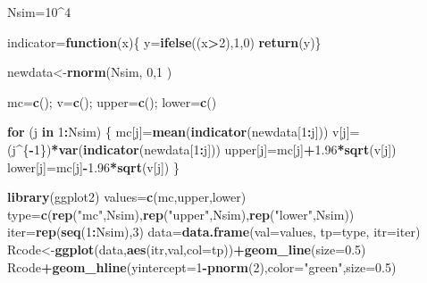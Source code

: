 \documentclass[]{book}
\newenvironment{Shaded}{\begin{snugshade}}{\end{snugshade}}
\newcommand{\ControlFlowTok}[1]{\textcolor[rgb]{0.13,0.29,0.53}{\textbf{#1}}}
\newcommand{\DataTypeTok}[1]{\textcolor[rgb]{0.13,0.29,0.53}{#1}}
\newcommand{\DecValTok}[1]{\textcolor[rgb]{0.00,0.00,0.81}{#1}}
\newcommand{\FloatTok}[1]{\textcolor[rgb]{0.00,0.00,0.81}{#1}}
\newcommand{\KeywordTok}[1]{\textcolor[rgb]{0.13,0.29,0.53}{\textbf{#1}}}
\newcommand{\NormalTok}[1]{#1}
\newcommand{\OperatorTok}[1]{\textcolor[rgb]{0.81,0.36,0.00}{\textbf{#1}}}
\newcommand{\StringTok}[1]{\textcolor[rgb]{0.31,0.60,0.02}{#1}}
\begin{document}
\begin{Shaded}
\begin{Highlighting}[]
\NormalTok{Nsim=}\DecValTok{10}\OperatorTok{^}\DecValTok{4}

\NormalTok{indicator=}\ControlFlowTok{function}\NormalTok{(x)\{}
\NormalTok{y=}\KeywordTok{ifelse}\NormalTok{((x}\OperatorTok{>}\DecValTok{2}\NormalTok{),}\DecValTok{1}\NormalTok{,}\DecValTok{0}\NormalTok{)}
\KeywordTok{return}\NormalTok{(y)\}}

\NormalTok{newdata<-}\KeywordTok{rnorm}\NormalTok{(Nsim, }\DecValTok{0}\NormalTok{,}\DecValTok{1}\NormalTok{ )}

\NormalTok{mc=}\KeywordTok{c}\NormalTok{(); v=}\KeywordTok{c}\NormalTok{(); upper=}\KeywordTok{c}\NormalTok{(); lower=}\KeywordTok{c}\NormalTok{()}

\ControlFlowTok{for}\NormalTok{ (j }\ControlFlowTok{in} \DecValTok{1}\OperatorTok{:}\NormalTok{Nsim)}
\NormalTok{\{}
\NormalTok{mc[j]=}\KeywordTok{mean}\NormalTok{(}\KeywordTok{indicator}\NormalTok{(newdata[}\DecValTok{1}\OperatorTok{:}\NormalTok{j]))}
\NormalTok{v[j]=(j}\OperatorTok{^}\NormalTok{\{}\OperatorTok{-}\DecValTok{1}\NormalTok{\})}\OperatorTok{*}\KeywordTok{var}\NormalTok{(}\KeywordTok{indicator}\NormalTok{(newdata[}\DecValTok{1}\OperatorTok{:}\NormalTok{j]))}
\NormalTok{upper[j]=mc[j]}\OperatorTok{+}\FloatTok{1.96}\OperatorTok{*}\KeywordTok{sqrt}\NormalTok{(v[j])}
\NormalTok{lower[j]=mc[j]}\OperatorTok{-}\FloatTok{1.96}\OperatorTok{*}\KeywordTok{sqrt}\NormalTok{(v[j])}
\NormalTok{\}}

\KeywordTok{library}\NormalTok{(ggplot2)}
\NormalTok{values=}\KeywordTok{c}\NormalTok{(mc,upper,lower)}
\NormalTok{type=}\KeywordTok{c}\NormalTok{(}\KeywordTok{rep}\NormalTok{(}\StringTok{"mc"}\NormalTok{,Nsim),}\KeywordTok{rep}\NormalTok{(}\StringTok{"upper"}\NormalTok{,Nsim),}\KeywordTok{rep}\NormalTok{(}\StringTok{"lower"}\NormalTok{,Nsim))}
\NormalTok{iter=}\KeywordTok{rep}\NormalTok{(}\KeywordTok{seq}\NormalTok{(}\DecValTok{1}\OperatorTok{:}\NormalTok{Nsim),}\DecValTok{3}\NormalTok{)}
\NormalTok{data=}\KeywordTok{data.frame}\NormalTok{(}\DataTypeTok{val=}\NormalTok{values, }\DataTypeTok{tp=}\NormalTok{type, }\DataTypeTok{itr=}\NormalTok{iter)}
\NormalTok{Rcode<-}\KeywordTok{ggplot}\NormalTok{(data,}\KeywordTok{aes}\NormalTok{(itr,val,}\DataTypeTok{col=}\NormalTok{tp))}\OperatorTok{+}\KeywordTok{geom_line}\NormalTok{(}\DataTypeTok{size=}\FloatTok{0.5}\NormalTok{)}
\NormalTok{Rcode}\OperatorTok{+}\KeywordTok{geom_hline}\NormalTok{(}\DataTypeTok{yintercept=}\DecValTok{1}\OperatorTok{-}\KeywordTok{pnorm}\NormalTok{(}\DecValTok{2}\NormalTok{),}\DataTypeTok{color=}\StringTok{"green"}\NormalTok{,}\DataTypeTok{size=}\FloatTok{0.5}\NormalTok{)}
\end{Highlighting}
\end{Shaded}
\end{document}
